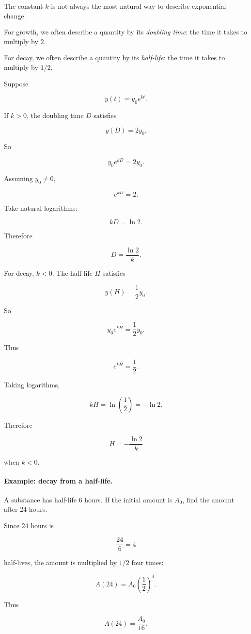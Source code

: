 The constant \(k\) is not always the most natural way to describe exponential change.

For growth, we often describe a quantity by its \emph{doubling time}: the time it takes
to multiply by \(2\).

For decay, we often describe a quantity by its \emph{half-life}: the time it takes to
multiply by \(1/2\).

Suppose

\[
y(t)=y_0e^{kt}.
\]

If \(k>0\), the doubling time \(D\) satisfies

\[
y(D)=2y_0.
\]

So

\[
y_0e^{kD}=2y_0.
\]

Assuming \(y_0\neq0\),

\[
e^{kD}=2.
\]

Take natural logarithms:

\[
kD=\ln 2.
\]

Therefore

\[
\boxed{
D=\frac{\ln2}{k}.
}
\]

For decay, \(k<0\).  The half-life \(H\) satisfies

\[
y(H)=\frac12y_0.
\]

So

\[
y_0e^{kH}=\frac12y_0.
\]

Thus

\[
e^{kH}=\frac12.
\]

Taking logarithms,

\[
kH=\ln\left(\frac12\right)=-\ln2.
\]

Therefore

\[
\boxed{
H=-\frac{\ln2}{k}
}
\]

when \(k<0\).

\paragraph{Example: decay from a half-life.}
A substance has half-life \(6\) hours.  If the initial amount is \(A_0\), find the amount
after \(24\) hours.

Since \(24\) hours is

\[
\frac{24}{6}=4
\]

half-lives, the amount is multiplied by \(1/2\) four times:

\[
A(24)=A_0\left(\frac12\right)^4.
\]

Thus

\[
\boxed{
A(24)=\frac{A_0}{16}.
}
\]

